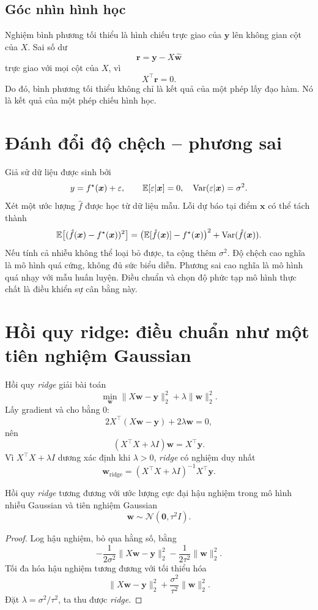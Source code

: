 \subsection{Góc nhìn hình học}

Nghiệm bình phương tối thiểu là hình chiếu trực giao của $\bm{y}$ lên không gian cột của $X$. Sai số dư
\[
\bm{r} = \bm{y}-X\hat{\bm{w}}
\]
trực giao với mọi cột của $X$, vì
\[
X^\top \bm{r}=0.
\]
Do đó, bình phương tối thiểu không chỉ là kết quả của một phép lấy đạo hàm. Nó là kết quả của một phép chiếu hình học.

\section{Đánh đổi độ chệch -- phương sai}

Giả sử dữ liệu được sinh bởi
\[
y = f^\star(\bm{x}) + \varepsilon,\qquad \mathbb{E}[\varepsilon|\bm{x}] = 0,\quad \mathrm{Var}(\varepsilon|\bm{x})=\sigma^2.
\]
Xét một ước lượng \(\hat{f}\) được học từ dữ liệu mẫu. Lỗi dự báo tại điểm \(\bm{x}\) có thể tách thành
\[
\mathbb{E}\big[(\hat{f}(\bm{x})-f^\star(\bm{x}))^2\big]
=
\big(\mathbb{E}[\hat{f}(\bm{x})]-f^\star(\bm{x})\big)^2
+
\mathrm{Var}(\hat{f}(\bm{x})).
\]
Nếu tính cả nhiễu không thể loại bỏ được, ta cộng thêm \(\sigma^2\). Độ chệch cao nghĩa là mô hình quá cứng, không đủ sức biểu diễn. Phương sai cao nghĩa là mô hình quá nhạy với mẫu huấn luyện. Điều chuẩn và chọn độ phức tạp mô hình thực chất là điều khiển sự cân bằng này.

\section{Hồi quy ridge: điều chuẩn như một tiên nghiệm Gaussian}

Hồi quy \emph{ridge} giải bài toán
\[
\min_{\bm{w}} \|X\bm{w}-\bm{y}\|_2^2 + \lambda \|\bm{w}\|_2^2.
\]
Lấy gradient và cho bằng 0:
\[
2X^\top(X\bm{w}-\bm{y})+2\lambda \bm{w}=0,
\]
nên
\[
(X^\top X+\lambda I)\bm{w}=X^\top \bm{y}.
\]
Vì \(X^\top X+\lambda I\) dương xác định khi \(\lambda>0\), \emph{ridge} có nghiệm duy nhất
\[
\hat{\bm{w}}_{\mathrm{ridge}}=(X^\top X+\lambda I)^{-1}X^\top \bm{y}.
\]

\begin{proposition}
Hồi quy \emph{ridge} tương đương với ước lượng cực đại hậu nghiệm trong mô hình nhiễu Gaussian và tiên nghiệm Gaussian
\[
\bm{w}\sim \mathcal{N}(\bm{0}, \tau^2 I).
\]
\end{proposition}

\begin{proof}
Log hậu nghiệm, bỏ qua hằng số, bằng
\[
-\frac{1}{2\sigma^2}\|X\bm{w}-\bm{y}\|_2^2 - \frac{1}{2\tau^2}\|\bm{w}\|_2^2.
\]
Tối đa hóa hậu nghiệm tương đương với tối thiểu hóa
\[
\|X\bm{w}-\bm{y}\|_2^2 + \frac{\sigma^2}{\tau^2}\|\bm{w}\|_2^2.
\]
Đặt \(\lambda=\sigma^2/\tau^2\), ta thu được \emph{ridge}.
\end{proof}

